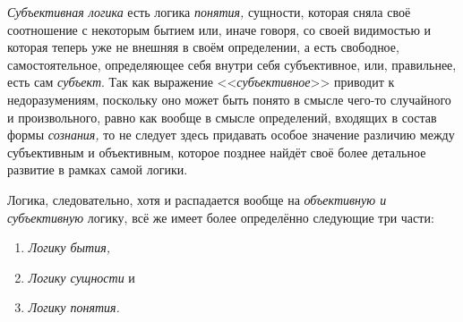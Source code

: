 {\em Субъективная логика} есть логика
{\em понятия,} сущности, которая сняла своё соотношение
с некоторым бытием или, иначе говоря, со своей видимостью и которая теперь
уже не внешняя в своём определении, а есть свободное, самостоятельное,
определяющее себя внутри себя субъективное, или, правильнее, есть сам
{\em субъект}. Так как выражение
<<{\em субъективное}>> приводит к недоразумениям,
поскольку оно может быть понято в смысле чего-то случайного и
произвольного, равно как вообще в смысле определений, входящих в состав
формы {\em сознания,} то не следует здесь придавать
особое значение различию между субъективным и объективным, которое позднее
найдёт своё более детальное развитие в рамках самой логики.

Логика, следовательно, хотя и распадается вообще на
{\em объективную и субъективную} логику, всё же имеет
более определённо следующие три части:
\begin{enumerate}[~~~~I.]
\item{\em Логику бытия,}
\item{\em Логику сущности} и
\item{\em Логику понятия.}
\end{enumerate}

\bigskip
